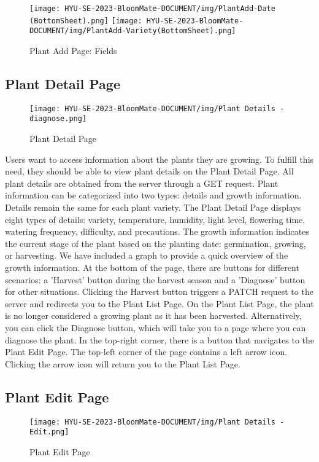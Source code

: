 \documentclass[conference, a4paper]{IEEEtran}
\begin{document}
        \begin{figure}[h]
    \centerline{
        \texttt{[image: HYU-SE-2023-BloomMate-DOCUMENT/img/PlantAdd-Date (BottomSheet).png]}
        \texttt{[image: HYU-SE-2023-BloomMate-DOCUMENT/img/PlantAdd-Variety(BottomSheet).png]}
    }
    \label{fig}
    \caption{Plant Add Page: Fields}
    \end{figure}
    
    \subsection{Plant Detail Page}
    \begin{figure}[h]
    \centering
    \texttt{[image: HYU-SE-2023-BloomMate-DOCUMENT/img/Plant Details - diagnose.png]}
    \label{fig}
    \caption{Plant Detail Page}
    \end{figure}
Users want to access information about the plants they are growing. To fulfill this need, they should be able to view plant details on the Plant Detail Page. All plant details are obtained from the server through a GET request. Plant information can be categorized into two types: details and growth information. Details remain the same for each plant variety. The Plant Detail Page displays eight types of details: variety, temperature, humidity, light level, flowering time, watering frequency, difficulty, and precautions. The growth information indicates the current stage of the plant based on the planting date: germination, growing, or harvesting. We have included a graph to provide a quick overview of the growth information. At the bottom of the page, there are buttons for different scenarios: a 'Harvest' button during the harvest season and a 'Diagnose' button for other situations. Clicking the Harvest button triggers a PATCH request to the server and redirects you to the Plant List Page. On the Plant List Page, the plant is no longer considered a growing plant as it has been harvested. Alternatively, you can click the Diagnose button, which will take you to a page where you can diagnose the plant. In the top-right corner, there is a button that navigates to the Plant Edit Page. The top-left corner of the page contains a left arrow icon. Clicking the arrow icon will return you to the Plant List Page.

    \subsection{Plant Edit Page}
    \begin{figure}[h]
    \centering
    \texttt{[image: HYU-SE-2023-BloomMate-DOCUMENT/img/Plant Details - Edit.png]}
    \label{fig}
    \caption{Plant Edit Page}
    \end{figure}
\end{document}
